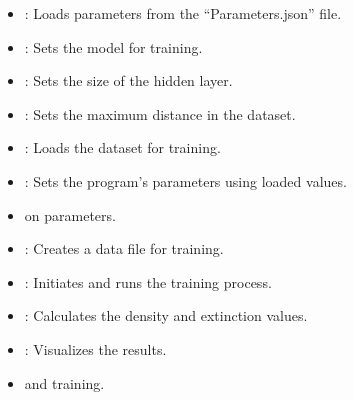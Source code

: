 \documentclass[letterpaper,10pt,english]{sphinxmanual}
\begin{document}
\begin{fulllineitems}
\begin{description}
\begin{itemize}
\item {} 
\sphinxAtStartPar
{}: Loads parameters from the “Parameters.json” file.

\item {} 
\sphinxAtStartPar
{}: Sets the model for training.

\item {} 
\sphinxAtStartPar
{}: Sets the size of the hidden layer.

\item {} 
\sphinxAtStartPar
{}: Sets the maximum distance in the dataset.

\item {} 
\sphinxAtStartPar
{}: Loads the dataset for training.

\item {} 
\sphinxAtStartPar
{}: Sets the program’s parameters using loaded values.

\item {} \begin{description}
\sphinxAtStartPar
on parameters.

\end{description}

\item {} 
\sphinxAtStartPar
{}: Creates a data file for training.

\item {} 
\sphinxAtStartPar
{}: Initiates and runs the training process.

\item {} 
\sphinxAtStartPar
{}: Calculates the density and extinction values.

\item {} 
\sphinxAtStartPar
{}: Visualizes the results.

\item {} \begin{description}
\sphinxAtStartPar
and training.


\end{description}
\end{itemize}
\end{description}
\end{fulllineitems}
\end{document}
